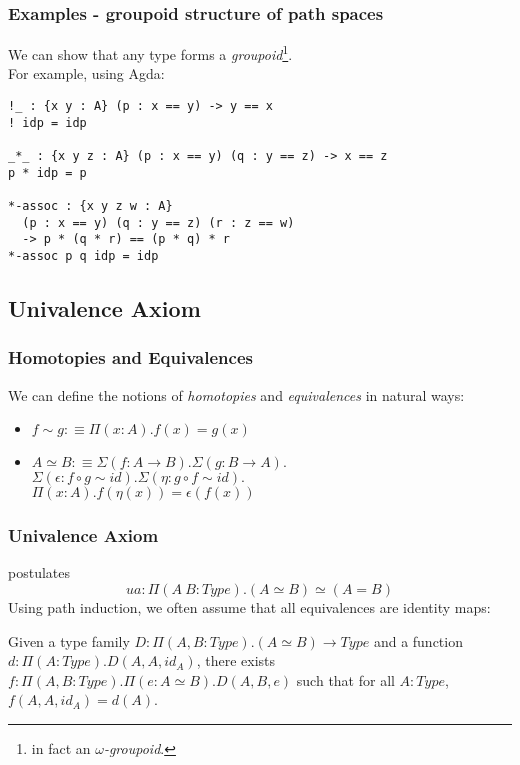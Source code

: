 \documentclass[dvipdfmx]{beamer}
\begin{document}
\begin{frame}[containsverbatim]
  \frametitle{Examples - groupoid structure of path spaces}
  We can show that any type forms a {\it groupoid}\footnote{
    in fact an {\it $\omega$-groupoid}.}.
  \\
  For example, using Agda:

  \begin{verbatim}
!_ : {x y : A} (p : x == y) -> y == x
! idp = idp

_*_ : {x y z : A} (p : x == y) (q : y == z) -> x == z
p * idp = p

*-assoc : {x y z w : A}
  (p : x == y) (q : y == z) (r : z == w)
  -> p * (q * r) == (p * q) * r
*-assoc p q idp = idp
  \end{verbatim}
\end{frame}

\subsection{Univalence Axiom}

\begin{frame}
  \frametitle{Homotopies and Equivalences}
  We can define the notions of {\it homotopies} and {\it equivalences}
  in natural ways:
  \begin{itemize}
    \item
    $f \sim g :\equiv \Pi \left( x : A \right) .
    f \left( x \right) = g \left( x \right)$
    \item
    $A \simeq B :\equiv \Sigma \left( f : A \to B \right) .
    \Sigma \left( g : B \to A \right) .$ \\
    $\Sigma \left( \epsilon : f \circ g \sim id \right) .
    \Sigma \left( \eta : g \circ f \sim id \right) .$ \\
    $\Pi \left( x : A \right) .
    f \left( \eta \left( x \right) \right) = \epsilon \left( f \left( x \right) \right)$
  \end{itemize}
\end{frame}

\begin{frame}
  \frametitle{Univalence Axiom}
  postulates
  $$
  ua : \Pi \left( A \ B : Type \right) .
  \left( A \simeq B \right) \simeq \left( A = B \right)
  $$
  Using path induction,
  we often assume that all equivalences are identity maps:

  \begin{theorem}
    Given a type family
    $D : \Pi \left( A , B : Type \right) . \left( A \simeq B \right)
    \to Type$ and a function
    $d : \Pi \left( A : Type \right) . D \left( A , A , id_A \right)$,
    there exists
    $f : \Pi \left( A , B : Type \right) .
    \Pi \left( e : A \simeq B \right) .
    D \left( A , B , e \right)$ such that
    for all $A : Type$,
    $f \left( A , A , id_A \right) = d \left( A \right)$.
  \end{theorem}
\end{frame}
\end{document}

